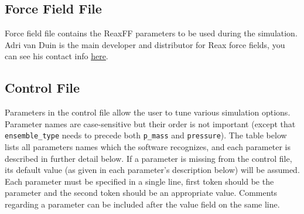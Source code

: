\documentclass{article}
\begin{document}
\subsection{Force Field File}
\label{sec:puremd_ffield}

Force field file contains the ReaxFF parameters to be used during 
the simulation. Adri van Duin is the main developer and distributor 
for Reax force fields, you can see his contact info
\href{http://www.mne.psu.edu/vanduin}{here}.


\subsection{Control File} 
\label{sec:puremd_control}

Parameters in the control file allow the user to tune various simulation 
options. Parameter names are case-sensitive but their order is not important 
(except that {\tt ensemble\_type} needs to precede both {\tt p\_mass} and 
{\tt pressure}). The table below lists all parameters names which the
software recognizes, and each parameter is described in further detail
below. If a parameter is missing from the control file, its default 
value (as given in each parameter's description below) will be assumed.
Each parameter must be specified in a single line, first token should be
the parameter and the second token should be an appropriate value. 
Comments regarding a parameter can be included after the value field 
on the same line.
\end{document}
